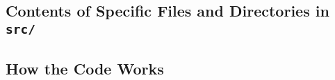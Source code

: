 \subsection{Contents of Specific Files and Directories in \texttt{src/}}









\subsection{How the Code Works}




